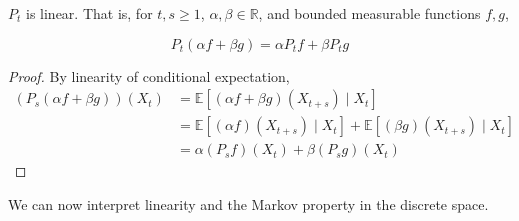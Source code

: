 \documentclass{article}
\begin{document}
  \begin{lemma}
    $P_t$ is linear. That is, for $t, s \geq 1$, $\alpha, \beta \in \mathbb{R}$, and bounded measurable functions $f, g$, 

      \[P_t (\alpha f + \beta g) = \alpha P_t f + \beta P_t g\] 
  \end{lemma}
  \begin{proof}
    By linearity of conditional expectation, 
    \begin{align*}
      (P_s (\alpha f + \beta g))(X_t) & = \mathbb{E}[(\alpha f + \beta g)(X_{t + s}) \mid X_t] \\
      & = \mathbb{E}[(\alpha f) (X_{t + s}) \mid X_t] + \mathbb{E}[(\beta g) (X_{t + s}) \mid X_t] \\
      & = \alpha (P_s f) (X_t) + \beta (P_s g) (X_t)
    \end{align*}
  \end{proof}

  We can now interpret linearity and the Markov property in the discrete space. 
\end{document}
